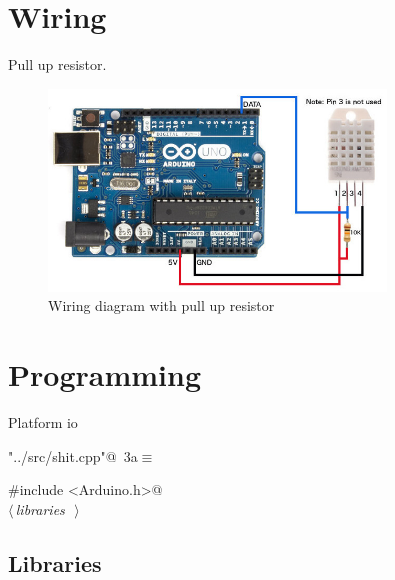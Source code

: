\documentclass[a4paper, 12pt]{article}
\begin{document}
\section{Wiring}

Pull up resistor.



\begin{figure}[H]
  \centering
  \includegraphics[width=0.8\textwidth]{wiring-dht22.jpg}
  \caption{Wiring diagram with pull up resistor}
\end{figure}



\section{Programming}

Platform io

\begin{flushleft} \small
\begin{minipage}{\linewidth}\label{scrap1}\raggedright\small
{}\verb@"../src/shit.cpp"@\nobreak\ {\footnotesize{3a}}$\equiv$
\vspace{-1ex}
\begin{list}{}{\setlength{\leftmargin}{1em}} \item
\mbox{}\verb@#include <Arduino.h>@\\
\mbox{}\verb@@$\langle\,${\itshape libraries}\ {\footnotesize {}}\,$\rangle\,$\verb@@\\
\mbox{}{\NWsep}
\end{list}
\vspace{-1ex}
\end{minipage}
\end{flushleft}


\subsection{Libraries}
\end{document}
